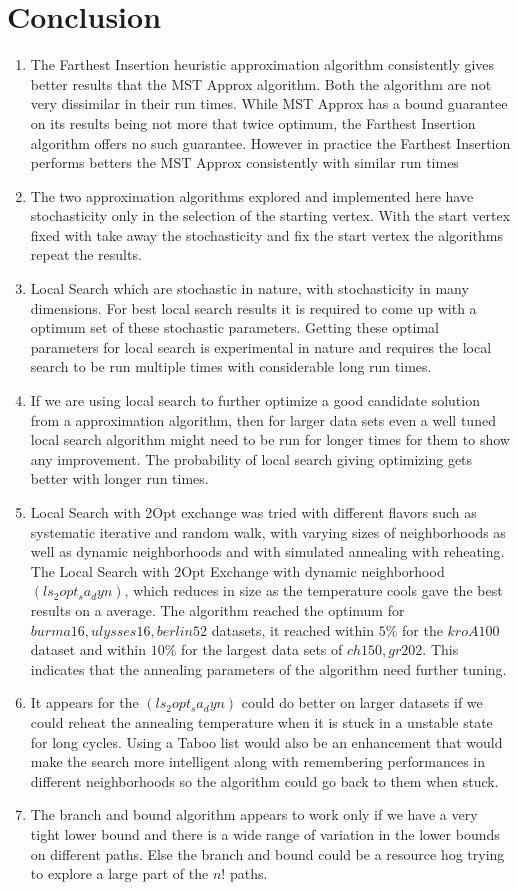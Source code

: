 \documentclass[twoside,11pt]{article}
\begin{document}
\section{Conclusion}
\begin{enumerate}
\item
The Farthest Insertion heuristic approximation algorithm consistently gives better results that the MST Approx algorithm. Both the algorithm are not very dissimilar in their run times. While MST Approx has a bound guarantee on its results being not more that twice optimum, the Farthest Insertion algorithm offers no such guarantee. However in practice the Farthest Insertion performs betters the MST Approx consistently with similar run times
\item
The two approximation algorithms explored and implemented here have stochasticity only in the selection of the starting vertex. With the start vertex fixed with take away the stochasticity and fix the start vertex the algorithms repeat the results.
\item
Local Search which are stochastic in nature, with stochasticity in many dimensions. For best local search results it is required to come up with a optimum  set of these stochastic parameters. Getting these optimal parameters for local search is  experimental in nature and requires the local search to be run multiple times with considerable long run times.
\item
If we are using local search to further optimize a good candidate solution from a approximation algorithm, then for larger data sets even a well tuned local search algorithm might need to be run for longer times for them to show any improvement. The probability of local search giving optimizing gets better with longer run times. 
\item
Local Search with 2Opt exchange was tried with different flavors such as systematic iterative and random walk, with varying sizes of neighborhoods as well as dynamic neighborhoods and with simulated annealing with reheating. The Local Search with 2Opt Exchange with dynamic neighborhood $(ls_2opt_sa_dyn)$, which reduces in size as the temperature cools gave the best results on a average. The algorithm reached the optimum for $burma16, ulysses16, berlin52$ datasets, it reached within $5\%$ for the $kroA100$ dataset and within $10\%$ for the largest data sets of $ch150 ,gr202$. This indicates that the annealing parameters of the algorithm need further tuning.
\item
It appears for the $(ls_2opt_sa_dyn)$ could do better on larger datasets if we could reheat the annealing temperature when it is stuck in a unstable state for long cycles. Using a Taboo list would also be an enhancement that would make the search more intelligent along with remembering performances in different neighborhoods so the algorithm could go back to them when stuck.
\item
The branch and bound algorithm appears to work only if we have a very tight lower bound and there is a wide range of variation in the lower bounds on different paths. Else the branch and bound could be a resource hog trying to explore a large part of the $n!$ paths.
\end{enumerate}



\end{document}
